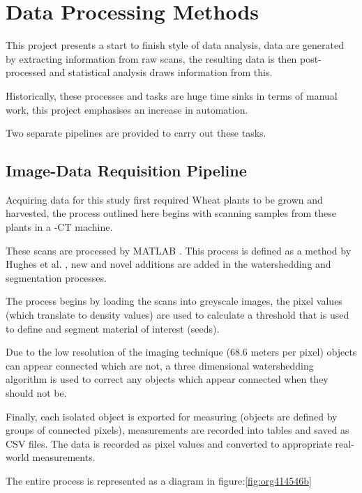 \documentclass[11pt]{report}
\begin{document}
\section{Data Processing Methods}
\label{sec:orgc4a09a0}
This project presents a start to finish style of data analysis, data are generated by extracting information from raw scans, the resulting data is then post-processed and statistical analysis draws information from this.

Historically, these processes and tasks are huge time sinks in terms of manual work, this project emphasises an increase in automation.

Two separate pipelines are provided to carry out these tasks.

\subsection{Image-Data Requisition Pipeline}
\label{sec:org7b31526}

Acquiring data for this study first required Wheat plants to be grown and harvested, the process outlined here begins with scanning samples from these plants in a \textmu{}-CT machine.

These scans are processed by MATLAB \cite{MATHWORKS2017}. This process is defined as a method by Hughes et al. \cite{Hughes2017}, new and novel additions are added in the watershedding and segmentation processes.

The process begins by loading the scans into greyscale images, the pixel values (which translate to density values) are used to calculate a threshold that is used to define and segment material of interest (seeds).

Due to the low resolution of the imaging technique (68.6\textmu{} meters per pixel) objects can appear connected which are not, a three dimensional watershedding algorithm is used to correct any objects which appear connected when they should not be.

Finally, each isolated object is exported for measuring (objects are defined by groups of connected pixels), measurements are recorded into tables and saved as CSV files. The data is recorded as pixel values and converted to appropriate real-world measurements.

The entire process is represented as a diagram in figure:\ref{fig:org414546b}
\end{document}
